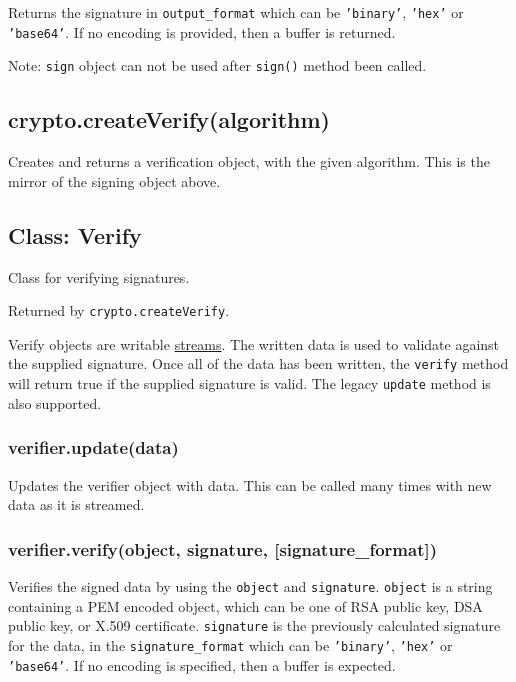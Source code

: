 Returns the signature in \texttt{output\_format} which can be
\texttt{'binary'}, \texttt{'hex'} or \texttt{'base64'}. If no encoding
is provided, then a buffer is returned.

Note: \texttt{sign} object can not be used after \texttt{sign()} method
been called.

\subsection{crypto.createVerify(algorithm)}

Creates and returns a verification object, with the given algorithm.
This is the mirror of the signing object above.

\subsection{Class: Verify}

Class for verifying signatures.

Returned by \texttt{crypto.createVerify}.

Verify objects are writable \href{stream.html}{streams}. The written
data is used to validate against the supplied signature. Once all of the
data has been written, the \texttt{verify} method will return true if
the supplied signature is valid. The legacy \texttt{update} method is
also supported.

\subsubsection{verifier.update(data)}

Updates the verifier object with data. This can be called many times
with new data as it is streamed.

\subsubsection{verifier.verify(object, signature,
{[}signature\_format{]})}

Verifies the signed data by using the \texttt{object} and
\texttt{signature}. \texttt{object} is a string containing a PEM encoded
object, which can be one of RSA public key, DSA public key, or X.509
certificate. \texttt{signature} is the previously calculated signature
for the data, in the \texttt{signature\_format} which can be
\texttt{'binary'}, \texttt{'hex'} or \texttt{'base64'}. If no encoding
is specified, then a buffer is expected.

